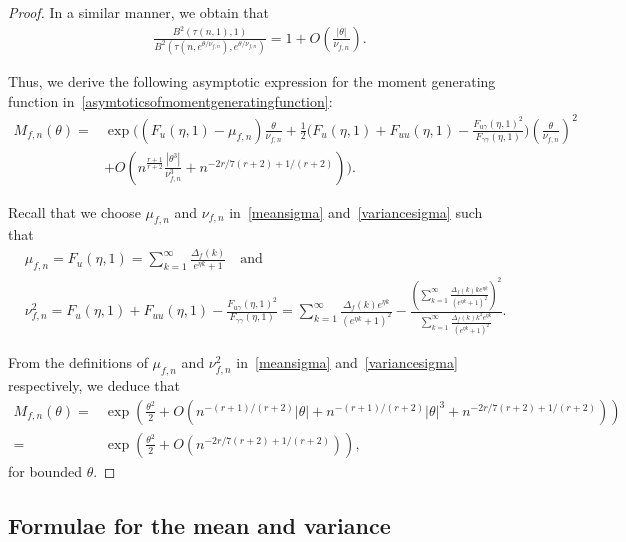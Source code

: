 \documentclass[12pt, oneside,reqno]{amsart}
\numberwithin{equation}{section}
\begin{document}
\begin{proof}
\noindent
In a similar manner, we obtain that
\begin{align*}
\frac{B^2(\tau(n,1),1)}{B^2(\tau(n,e^{\theta/\nu_{f,n}}),e^{\theta/\nu_{f,n}})}
=1+O\left(\frac{|\theta|}{\nu_{f,n}}\right).
\end{align*}

\noindent
Thus, we derive the following asymptotic expression for the moment generating function in~\eqref{asymtoticsofmomentgeneratingfunction}:
\begin{align*}
M_{f,n}(\theta)
=&\exp\Bigg((F_{u}(\eta,1)-\mu_{f,n})\frac{\theta}{\nu_{f,n}}+\frac{1}{2}\bigg(F_{u}(\eta,1)+F_{uu}(\eta,1)-\frac{F_{u\gamma}(\eta,1)^2}{F_{\gamma\gamma}(\eta,1)}\bigg)\left(\frac{\theta}{\nu_{f,n}}\right)^2\\
&+O\left(n^{\frac{r+1}{r+2}}\frac{|\theta^3|}{\nu^3_{f,n}}+n^{-2r/7(r+2)+1/(r+2)}\right)\Bigg).
\end{align*}

\noindent
Recall that we choose $\mu_{f,n}$ and $\nu_{f,n}$ in~\eqref{meansigma} and~\eqref{variancesigma} such that
\begin{align}\label{meanvarianceformulatosolve}
&\mu_{f,n}
=F_{u}(\eta,1)
=\sum_{k=1}^{\infty}\frac{\Delta_f(k)}{e^{\eta k}+1}\quad\text{and}\quad\nonumber\\
&\nu^2_{f,n}
=F_{u}(\eta,1)+F_{uu}(\eta,1)-\frac{F_{u\gamma}(\eta,1)^2}{F_{\gamma\gamma}(\eta,1)}
=\sum_{k=1}^{\infty}\frac{\Delta_f(k)e^{\eta k}}{(e^{\eta k}+1)^2}-\frac{\left(\sum_{k=1}^{\infty}\frac{\Delta_f(k)ke^{\eta k}}{(e^{\eta k}+1)^2}\right)^2}{\sum_{k=1}^{\infty}\frac{\Delta_f(k)k^2e^{\eta k}}{(e^{\eta k}+1)^2}}.
\end{align}

\noindent
From the definitions of $\mu_{f,n}$ and $\nu^2_{f,n}$ in~\eqref{meansigma} and~\eqref{variancesigma} respectively, we deduce that
\begin{align*}
M_{f,n}(\theta)
=&\exp\left(\frac{\theta^2}{2}+O\left(n^{-(r+1)/(r+2)}|\theta|+n^{-(r+1)/(r+2)}|\theta|^3+n^{-2r/7(r+2)+1/(r+2)}\right)\right)\\
=&\exp\left(\frac{\theta^2}{2}+O\left(n^{-2r/7(r+2)+1/(r+2)}\right)\right),
\end{align*}
for bounded $\theta$.
\end{proof}


\subsection{Formulae for the mean and variance} 
\end{document}

